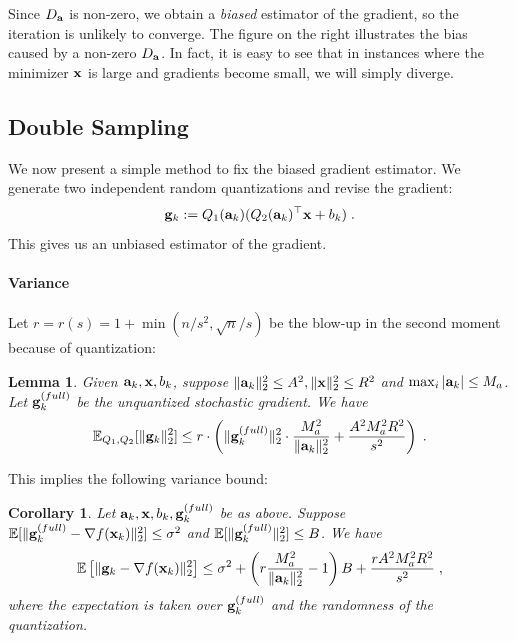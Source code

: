 \documentclass{article}
\def\a{{\bf a}}
\def\g{{\bf g}}
\def\x{{\bf x}}
\def\E{\mathbb{E}}
\newtheorem{lemma}{Lemma}
\newtheorem{corollary}{Corollary}
\begin{document}
\vspace{-0.5em}
Since $D_{\a}$ is non-zero, we obtain a \emph{biased} estimator of the gradient, so the iteration is unlikely to converge. 
The figure on the right illustrates the bias
caused by a non-zero $D_{\a}$.
In fact, it is easy to see that in instances where the minimizer $\x$ is large and gradients become small, we will simply diverge. 

\vspace{-0.5em}
\subsection{Double Sampling}
\vspace{-0.5em}

We now present a simple method to fix the biased gradient estimator.
We generate two independent
random quantizations and revise the gradient:
\[
\g_k := Q_1 (\a_k) (Q_2 (\a_k)^\top \x + b_k) \; .
\]
This gives us an unbiased estimator 
of the gradient.

\vspace{-0.5em}
\paragraph{Variance}

Let $r = r(s) = 1 + \min (n / s^2, \sqrt{n}/ s)$ be the blow-up in the second moment because of quantization:
\begin{lemma}
\label{lem:qbound}
    Given $\a_k, \x, b_k$, suppose $\| \a_k \|_2^2 \leq A^2, \| \x \|_2^2 \leq R^2$ and $\max_i |\a_k| \leq M_a$.
    Let $\g_k^{(full)}$ be the unquantized stochastic gradient. We have
    \[
    \E_{Q_1, Q_2} [\| \g_k \|_2^2] \leq r \cdot \left( \| \g_k^{(full)} \|_2^2 \cdot \frac{M_a^2}{\| \a_k \|_2^2} + \frac{A^2 M_a^2 R^2}{s^2} \right)\; .
    \]
\end{lemma}

This implies the following variance bound:
\begin{corollary}
    Let $\a_k, \x, b_k, \g_k^{(full)}$ be as above.
    Suppose $\E [\| \g_k^{(full)} - \nabla f(\x_k) \|_2^2 ] \leq \sigma^2$ and $\E [\| \g_k^{(full)} \|_2^2] \leq B$. We have
    \[
    \E \left[ \| \g_k - \nabla f(\x_k) \|_2^2 \right] \leq  \sigma^2 + \left(r \frac{M_a^2}{\| \a_k \|_2^2} - 1\right) B + \frac{r A^2 M_a^2 R^2}{s^2} \; ,
    \]
    where the expectation is taken over $\g_k^{(full)}$ and the randomness of the quantization.
\end{corollary}
\end{document}
